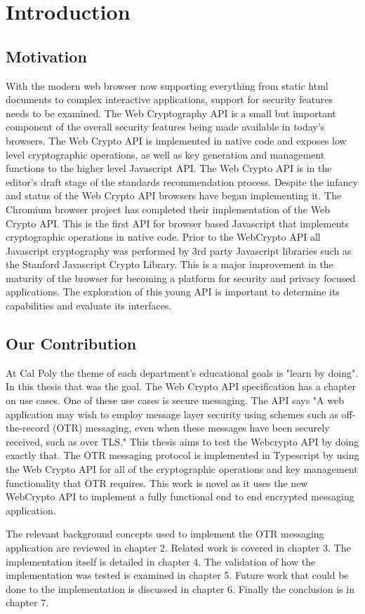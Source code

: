 \chapter{Introduction}


\section{Motivation}


With the modern web browser now supporting everything from static html documents to complex interactive applications, support for security features needs to be examined. The Web Cryptography API is a small but important component of the overall security features being made available in today's browsers. The Web Crypto API is implemented in native code and exposes low level cryptographic operations, as well as key generation and management functions to the higher level Javascript API. The Web Crypto API is in the editor's draft stage of the standards recommendation process.\cite{webcrypto-overview} Despite the infancy and status of the Web Crypto API browsers have began implementing it. The Chromium browser project has completed their implementation of the Web Crypto API.\cite{webcrypto-chromium} This is the first API for browser based Javascript that implements cryptographic operations in native code. Prior to the WebCrypto API all Javascript cryptography was performed by 3rd party Javascript libraries such as the Stanford Javascript Crypto Library.\cite{sjcl-library} This is a major improvement in the maturity of the browser for becoming a platform for security and privacy focused applications. The exploration of this young API is important to determine its capabilities and evaluate its interfaces.


\section{Our Contribution}


At Cal Poly the theme of each department's educational goals is "learn by doing". In this thesis that was the goal. The Web Crypto API specification has a chapter on use cases. One of these use cases is secure messaging. The API says "A web application may wish to employ message layer security using schemes such as off-the-record (OTR) messaging, even when these messages have been securely received, such as over TLS."\cite{webcrypto-overview} This thesis aims to test the Webcrypto API by doing exactly that. The OTR messaging protocol is implemented in Typescript by using the Web Crypto API for all of the cryptographic operations and key management functionality that OTR requires. This work is novel as it uses the new WebCrypto API to implement a fully functional end to end encrypted messaging application.  


The relevant background concepts used to implement the OTR messaging application are reviewed in chapter 2. Related work is covered in chapter 3. The implementation itself is detailed in chapter 4. The validation of how the implementation was tested is examined in chapter 5. Future work that could be done to the implementation is discussed in chapter 6. Finally the conclusion is in chapter 7.
  

